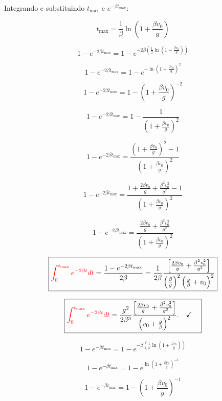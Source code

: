 \documentclass[a4paper,12pt]{article}
\begin{document}
\begin{flushleft}
Integrando e substituindo \(t_\text{max}\) e \(e^{-\beta t_\text{max}}\):

\[
t_\text{max} = \frac{1}{\beta} \ln \left( 1 + \frac{\beta v_0}{g} \right)
\]

\[
1 - e^{-2\beta t_\text{max}} = 1 - e^{-2\beta \left(\frac{1}{\beta} \ln \left( 1 + \frac{\beta v_0}{g} \right)\right)}
\]

\[
1 - e^{-2\beta t_\text{max}} = 1 - e^{-\ln \left( 1 + \frac{\beta v_0}{g} \right)^2}
\]

\[
1 - e^{-2\beta t_\text{max}} = 1 - \left( 1 + \frac{\beta v_0}{g} \right)^{-2}
\]

\[
1 - e^{-2\beta t_\text{max}} = 1 - \frac{1}{\left( 1 + \frac{\beta v_0}{g} \right)^{2}}
\]

\[
1 - e^{-2\beta t_\text{max}} = \frac{\left( 1 + \frac{\beta v_0}{g} \right)^{2} -1}{\left( 1 + \frac{\beta v_0}{g} \right)^{2}}
\]

\[
1 - e^{-2\beta t_\text{max}} = \frac{1 + \frac{2\beta v_0}{g} + \frac{\beta^2 v_0^2}{g^2} - 1}{\left( 1 + \frac{\beta v_0}{g} \right)^{2}}
\]

\[
\boxed{
1 - e^{-2\beta t_\text{max}} = \frac{\frac{2\beta v_0}{g} + \frac{\beta^2 v_0^2}{g^2}}{\left( 1 + \frac{\beta v_0}{g} \right)^{2}}
}
\]

\[
\boxed{
\begin{aligned}
\textcolor{red}{\int_0^{t_\text{max}} e^{-2\beta t} dt} &= \frac{1 - e^{-2 \beta t_\text{max}}}{2\beta} =  \frac{1}{2\beta} \frac{\left[\frac{2\beta v_0}{g} + \frac{\beta^2 v_0^2}{g^2} \right]}{\left(\frac{\beta}{g}\right)^2 \left( \frac{g}{\beta} + v_0 \right)^{2}}\\
\end{aligned}
}
\]

\[
\boxed{
\begin{aligned}
\textcolor{red}{\int_0^{t_\text{max}} e^{-2\beta t} dt} &= \frac{g^2}{2 \beta^3} \frac{\left[\frac{2\beta v_0}{g} + \frac{\beta^2 v_0^2}{g^2} \right]}{\left( v_0 + \frac{g}{\beta} \right)^{2}}. \quad \checkmark
\end{aligned}
}
\]

\[
1 - e^{-\beta t_\text{max}} = 1 - e^{-\beta \left(\frac{1}{\beta} \ln \left( 1 + \frac{\beta v_0}{g} \right)\right)}
\]

\[
1 - e^{-\beta t_\text{max}} = 1 - e^{\ln \left( 1 + \frac{\beta v_0}{g} \right)^{-1}}
\]

\[
1 - e^{-\beta t_\text{max}} = 1 - \left( 1 + \frac{\beta v_0}{g} \right)^{-1}
\]


\end{flushleft}
\end{document}
